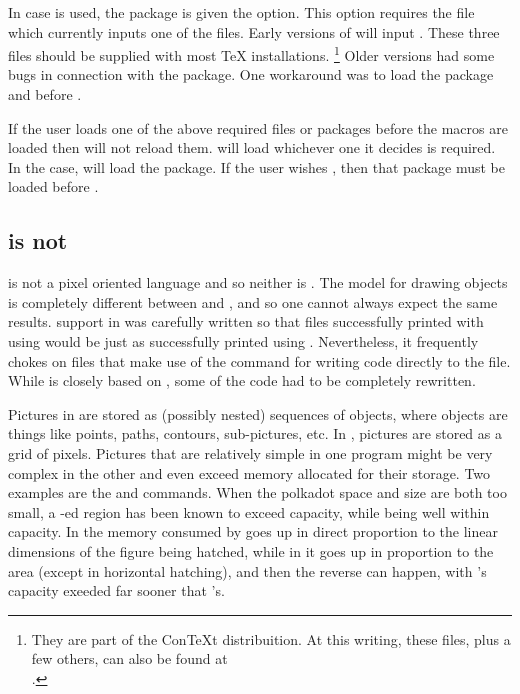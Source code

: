 \documentclass[letterpaper]{article}
\begin{document}
In case \pdfLaTeX{} is used, the  package is given the
 option. This option requires the file 
which currently inputs one of the  files. Early versions
of  will input . These three files
should be supplied with most \TeX{} installations.%
    \footnote{They are part of the Con\TeX{}t distribuition. At this writing,
    these files, plus a few others, can also be found at\\
    .} %
Older versions had some bugs in connection with the 
package. One workaround was to load the  package and
\mfp{} before .

If the user loads one of the above required files or packages before the
\mfp{} macros are loaded then \mfp{} will not reload them. \Mfp{} will
load whichever one it decides is required. In the \LaTeXe{} case, \mfp{}
will load the  package. If the user wishes
, then that package must be loaded before \mfp{}.


\subsection{\CMP{} is not \MF{}}

\PS{} is not a pixel oriented language and so neither is \MP{}. The model
for drawing objects is completely different between \MF{} and \MP{}, and
so one cannot always expect the same results. \CMP{} support in
\mfp{} was carefully written so that files successfully printed
with \mfp{} using \MF{} would be just as successfully printed
using \MP{}. Nevertheless, it frequently chokes on files that make use of
the  command for writing code directly to the  file.
While  is closely based on , some of
the code had to be completely rewritten.

Pictures in \MP{} are stored as (possibly nested) sequences of objects,
where objects are things like points, paths, contours, sub-pictures,
etc. In \MF{}, pictures are stored as a grid of pixels. Pictures that are
relatively simple in one program might be very complex in the other and
even exceed memory allocated for their storage. Two examples are the
 and  commands. When the polkadot space and size
are both too small, a -ed region has been known to exceed
\MP{} capacity, while being well within \MF{} capacity. In \MP{} the
memory consumed by  goes up in direct proportion to the linear
dimensions of the figure being hatched, while in \MF{} it goes up in
proportion to the area (except in horizontal hatching), and then the
reverse can happen, with \MF{}'s capacity exeeded far sooner that \MP{}'s.
\end{document}
